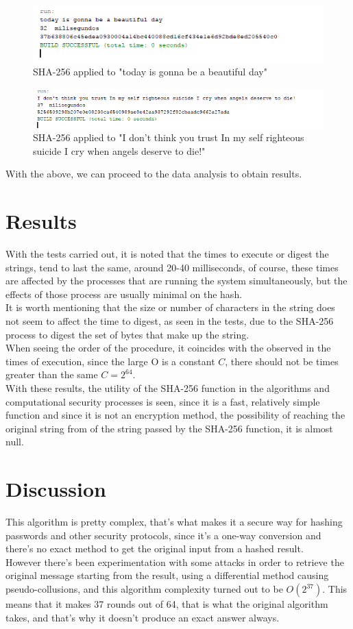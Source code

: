 \documentclass[journal]{IEEEtran}
\begin{document}
\begin{figure}[H] 
	\centering \includegraphics[width=.70\columnwidth]{Code_today.png}
	\caption{
		\label{fig:samplesetup}
		SHA-256 applied to "today is gonna be a beautiful day"
	}
\end{figure}
\begin{figure}[H] 
	\centering \includegraphics[width=.70\columnwidth]{Code_Long.png}
	\caption{
		\label{fig:samplesetup}
		SHA-256 applied to "I don't think you trust In my self righteous suicide I cry when angels deserve to die!"
	}
\end{figure}

With the above, we can proceed to the data analysis to obtain results.
\section{Results}
With the tests carried out, it is noted that the times to execute or digest the strings, tend to last the same, around 20-40 milliseconds,
of course, these times are affected by the processes that are running the system simultaneously, but the effects of those process are usually minimal on the hash.\\It is worth mentioning that the size or number of characters in the string does not seem to affect the time to digest, as seen in the tests, due to the SHA-256 process to digest the set of bytes that make up the string.\\When seeing the order of the procedure, it coincides with the observed in the times of execution, since the large O is a constant $C$, there should not be times greater than the same $C=2^{64}$.\\With these results, the utility of the SHA-256 function in the algorithms and computational security processes is seen, since it is a fast, relatively simple function and since it is not an encryption method, the possibility of reaching the original string from of the string passed by the SHA-256 function, it is almost null.
\section{Discussion}
This algorithm is pretty complex, that's what makes it a secure way for hashing passwords and other security protocols, since it's a one-way conversion and there's no exact method to get the original input from a hashed result.\\
However there's been experimentation with some attacks in order to retrieve the original message starting from the result, using a differential method causing pseudo-collusions, and this algorithm complexity turned out to be $O(2^{37})$. This means that it makes 37 rounds out of 64, that is what the original algorithm takes, and that's why it doesn't produce an exact answer always.
\end{document}
